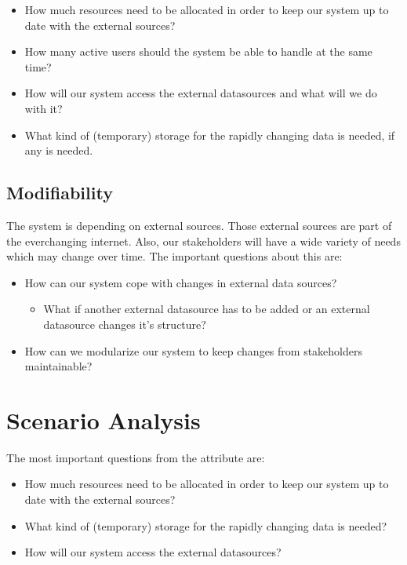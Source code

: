 \documentclass{article}
\begin{document}
\begin{itemize}
\item How much resources need to be allocated in order to keep our system up to date with the external sources?
\item How many active users should the system be able to handle at the same time?
\item How will our system access the external datasources and what will we do with it?
\item What kind of (temporary) storage for the rapidly changing data is needed, if any is needed.
\end{itemize}

\subsection*{Modifiability}
The system is depending on external sources. Those external sources are part of the everchanging internet. Also, our stakeholders will have a wide variety of needs which may change over time. The important questions about this are:

\begin{itemize}
\item How can our system cope with changes in external data sources?  
\begin{itemize}
\item What if another external datasource has to be added or an external datasource changes it's structure?
\end{itemize}
\item How can we modularize our system to keep changes from stakeholders maintainable?
\end{itemize}

\section*{Scenario Analysis}

The most important questions from the attribute are: 
\begin{itemize}
\item How much resources need to be allocated in order to keep our system up to date with the external sources?
\item What kind of (temporary) storage for the rapidly changing data is needed?
\item How will our system access the external datasources?
\end{itemize}
\end{document}

